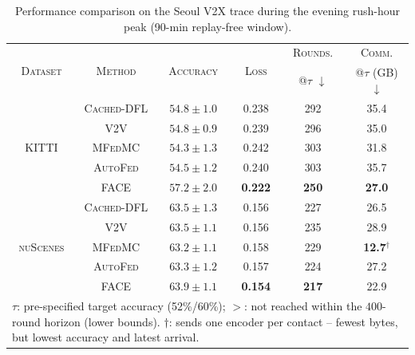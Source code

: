 \begin{table}[t]
    \centering
\caption{Performance comparison on the Seoul V2X trace during the evening rush-hour peak (90-min replay-free window).}
    \label{tab:seoul_results}
    \footnotesize
    \renewcommand{\arraystretch}{1.0}
    \setlength{\tabcolsep}{3pt}
    \begin{tabular}{c|c|c|c|c|c}
        \toprule
        \multirow{2}{*}{\textsc{Dataset}}
        & \multirow{2}{*}{\textsc{Method}}
        & \multirow{2}{*}{\textsc{Accuracy}}
        & \multirow{2}{*}{\textsc{Loss}}
        & \textsc{Rounds.}
        & \textsc{Comm.} \\

        &
        &
        &
        & @$\tau$ $\downarrow$
        & @$\tau$ (GB) $\downarrow$ \\
        \midrule

        \multirow{5}{*}{\textsc{KITTI}}
        & \textsc{Cached-DFL}
        & $54.8 \pm 1.0$
        & 0.238
        & 292
        & 35.4 \\

        & \textsc{V2V}
        & $54.8 \pm 0.9$
        & 0.239
        & 296
        & 35.0 \\[1pt]

        & \textsc{MFedMC}
        & $54.3 \pm 1.3$
        & 0.242
        & 303
        & 31.8 \\

        & \textsc{AutoFed}
        & $54.5 \pm 1.2$
        & 0.240
        & 303
        & 35.7 \\[1pt]

        & \textsc{FACE}
        & $\mathbf{57.2 \pm 2.0}$
        & \textbf{0.222}
        & \textbf{250}
        & \textbf{27.0} \\

        \midrule

        \multirow{5}{*}{\textsc{nuScenes}}
        & \textsc{Cached-DFL}
        & $63.5 \pm 1.3$
        & 0.156
        & 227
        & 26.5 \\

        & \textsc{V2V}
        & $63.5 \pm 1.1$
        & 0.156
        & 235
        & 28.9 \\[1pt]

        & \textsc{MFedMC}
        & $63.2 \pm 1.1$
        & 0.158
        & 229
        & \textbf{12.7}$^{\dagger}$ \\

        & \textsc{AutoFed}
        & $63.3 \pm 1.2$
        & 0.157
        & 224
        & 27.2 \\[1pt]

        & \textsc{FACE}
        & $\mathbf{63.9 \pm 1.1}$
        & \textbf{0.154}
        & \textbf{217}
        & 22.9 \\

        \bottomrule
        \multicolumn{6}{l}{
            \scriptsize $\tau$: pre-specified target accuracy (52\%/60\%); $>$: not reached within the $400$-round horizon (lower bounds). $\dagger$: sends one encoder per contact -- fewest bytes, but lowest accuracy and latest arrival.
        }
    \end{tabular}
\end{table}
